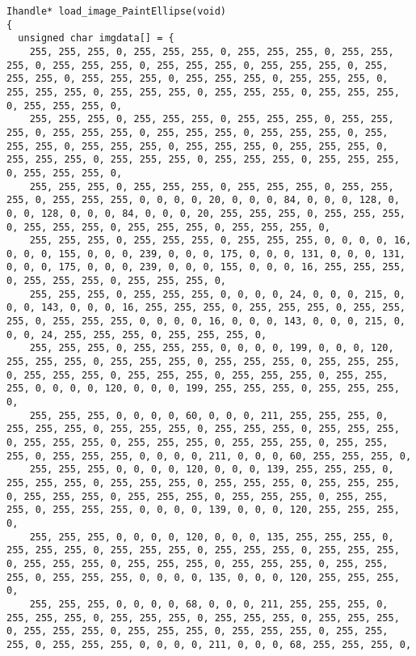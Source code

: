 \documentclass{ctexart}
\begin{document}
\begin{lstlisting}
Ihandle* load_image_PaintEllipse(void)
{
  unsigned char imgdata[] = {
    255, 255, 255, 0, 255, 255, 255, 0, 255, 255, 255, 0, 255, 255, 255, 0, 255, 255, 255, 0, 255, 255, 255, 0, 255, 255, 255, 0, 255, 255, 255, 0, 255, 255, 255, 0, 255, 255, 255, 0, 255, 255, 255, 0, 255, 255, 255, 0, 255, 255, 255, 0, 255, 255, 255, 0, 255, 255, 255, 0, 255, 255, 255, 0,
    255, 255, 255, 0, 255, 255, 255, 0, 255, 255, 255, 0, 255, 255, 255, 0, 255, 255, 255, 0, 255, 255, 255, 0, 255, 255, 255, 0, 255, 255, 255, 0, 255, 255, 255, 0, 255, 255, 255, 0, 255, 255, 255, 0, 255, 255, 255, 0, 255, 255, 255, 0, 255, 255, 255, 0, 255, 255, 255, 0, 255, 255, 255, 0,
    255, 255, 255, 0, 255, 255, 255, 0, 255, 255, 255, 0, 255, 255, 255, 0, 255, 255, 255, 0, 0, 0, 0, 20, 0, 0, 0, 84, 0, 0, 0, 128, 0, 0, 0, 128, 0, 0, 0, 84, 0, 0, 0, 20, 255, 255, 255, 0, 255, 255, 255, 0, 255, 255, 255, 0, 255, 255, 255, 0, 255, 255, 255, 0,
    255, 255, 255, 0, 255, 255, 255, 0, 255, 255, 255, 0, 0, 0, 0, 16, 0, 0, 0, 155, 0, 0, 0, 239, 0, 0, 0, 175, 0, 0, 0, 131, 0, 0, 0, 131, 0, 0, 0, 175, 0, 0, 0, 239, 0, 0, 0, 155, 0, 0, 0, 16, 255, 255, 255, 0, 255, 255, 255, 0, 255, 255, 255, 0,
    255, 255, 255, 0, 255, 255, 255, 0, 0, 0, 0, 24, 0, 0, 0, 215, 0, 0, 0, 143, 0, 0, 0, 16, 255, 255, 255, 0, 255, 255, 255, 0, 255, 255, 255, 0, 255, 255, 255, 0, 0, 0, 0, 16, 0, 0, 0, 143, 0, 0, 0, 215, 0, 0, 0, 24, 255, 255, 255, 0, 255, 255, 255, 0,
    255, 255, 255, 0, 255, 255, 255, 0, 0, 0, 0, 199, 0, 0, 0, 120, 255, 255, 255, 0, 255, 255, 255, 0, 255, 255, 255, 0, 255, 255, 255, 0, 255, 255, 255, 0, 255, 255, 255, 0, 255, 255, 255, 0, 255, 255, 255, 0, 0, 0, 0, 120, 0, 0, 0, 199, 255, 255, 255, 0, 255, 255, 255, 0,
    255, 255, 255, 0, 0, 0, 0, 60, 0, 0, 0, 211, 255, 255, 255, 0, 255, 255, 255, 0, 255, 255, 255, 0, 255, 255, 255, 0, 255, 255, 255, 0, 255, 255, 255, 0, 255, 255, 255, 0, 255, 255, 255, 0, 255, 255, 255, 0, 255, 255, 255, 0, 0, 0, 0, 211, 0, 0, 0, 60, 255, 255, 255, 0,
    255, 255, 255, 0, 0, 0, 0, 120, 0, 0, 0, 139, 255, 255, 255, 0, 255, 255, 255, 0, 255, 255, 255, 0, 255, 255, 255, 0, 255, 255, 255, 0, 255, 255, 255, 0, 255, 255, 255, 0, 255, 255, 255, 0, 255, 255, 255, 0, 255, 255, 255, 0, 0, 0, 0, 139, 0, 0, 0, 120, 255, 255, 255, 0,
    255, 255, 255, 0, 0, 0, 0, 120, 0, 0, 0, 135, 255, 255, 255, 0, 255, 255, 255, 0, 255, 255, 255, 0, 255, 255, 255, 0, 255, 255, 255, 0, 255, 255, 255, 0, 255, 255, 255, 0, 255, 255, 255, 0, 255, 255, 255, 0, 255, 255, 255, 0, 0, 0, 0, 135, 0, 0, 0, 120, 255, 255, 255, 0,
    255, 255, 255, 0, 0, 0, 0, 68, 0, 0, 0, 211, 255, 255, 255, 0, 255, 255, 255, 0, 255, 255, 255, 0, 255, 255, 255, 0, 255, 255, 255, 0, 255, 255, 255, 0, 255, 255, 255, 0, 255, 255, 255, 0, 255, 255, 255, 0, 255, 255, 255, 0, 0, 0, 0, 211, 0, 0, 0, 68, 255, 255, 255, 0,

\end{lstlisting}
\end{document}
